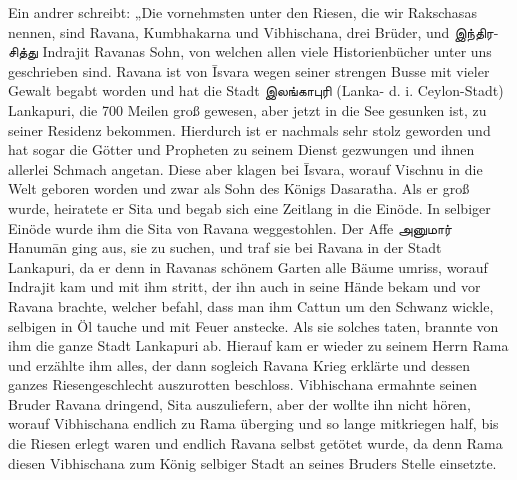 \documentclass{article}
\newcommand{\TamilText}[1]{\texttamil{#1}}
\newcommand{\tam}[1]{\TamilText{#1}}
\begin{document}
Ein andrer schreibt: „Die vornehmsten unter den Riesen, die wir Rakschasas nennen, sind Ravana, Kumbhakarna und Vibhischana, drei Brüder, und \tam{இந்திரசித்து} Indrajit Ravanas Sohn, von welchen allen viele Historienbücher unter uns geschrieben sind. Ravana ist von \={I}svara wegen seiner strengen Busse mit vieler Gewalt begabt worden und hat die Stadt \tam{இலங்காபுரி} (Lanka- d. i. Ceylon-Stadt) Lankapuri, die 700 Meilen groß gewesen, aber jetzt in die See gesunken ist, zu seiner Residenz bekommen. Hierdurch ist er nachmals sehr stolz geworden und hat sogar die Götter und Propheten zu seinem Dienst gezwungen und ihnen allerlei Schmach angetan. Diese aber klagen bei \={I}svara, worauf Vischnu in die Welt geboren worden und zwar als Sohn des Königs Dasaratha. Als er groß wurde, heiratete er Sita und begab sich eine Zeitlang in die Einöde. In selbiger Einöde wurde ihm die Sita von Ravana weggestohlen. Der Affe \tam{அனுமார்} Hanum\={a}n ging aus, sie zu suchen, und traf sie bei Ravana in der Stadt Lankapuri, da er denn in Ravanas schönem Garten alle Bäume umriss, worauf Indrajit kam und mit ihm stritt, der ihn auch in seine Hände bekam und vor Ravana brachte, welcher befahl, dass man ihm Cattun um den Schwanz wickle, selbigen in Öl tauche und mit Feuer anstecke. Als sie solches taten, brannte von ihm die ganze Stadt Lankapuri ab. Hierauf kam er wieder zu seinem Herrn Rama und erzählte ihm alles, der dann sogleich Ravana Krieg erklärte und dessen ganzes Riesengeschlecht auszurotten beschloss. Vibhischana ermahnte seinen Bruder Ravana dringend, Sita auszuliefern, aber der wollte ihn nicht hören, worauf Vibhischana endlich zu Rama überging und so lange mitkriegen half, bis die Riesen erlegt waren und endlich Ravana selbst getötet wurde, da denn Rama diesen Vibhischana zum König selbiger Stadt an seines Bruders Stelle einsetzte.
\end{document}
